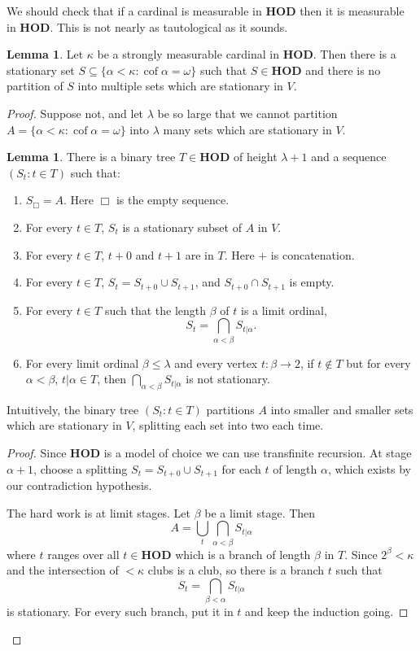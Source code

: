\documentclass[12pt]{report}
\newcommand{\HOD}{\mathbf{HOD}}
\DeclareMathOperator{\cof}{cof}
\theoremstyle{definition}
\newtheorem{lemma}[theorem]{Lemma}
\begin{document}
We should check that if a cardinal is measurable in $\HOD$ then it is measurable in $\HOD$. This is not nearly as tautological as it sounds.
\begin{lemma}
Let $\kappa$ be a strongly measurable cardinal in $\HOD$.
Then there is a stationary set $S \subseteq \{\alpha < \kappa: \cof \alpha = \omega\}$ such that $S \in \HOD$ and there is no partition of $S$ into multiple sets which are stationary in $V$.
\end{lemma}
\begin{proof}
Suppose not, and let $\lambda$ be so large that we cannot partition $A = \{\alpha < \kappa: \cof \alpha = \omega\}$ into $\lambda$ many sets which are stationary in $V$.
\begin{lemma}
There is a binary tree $T \in \HOD$ of height $\lambda + 1$ and a sequence $(S_t: t \in T)$ such that:
\begin{enumerate}
\item $S_\Box = A$. Here $\Box$ is the empty sequence.
\item For every $t \in T$, $S_t$ is a stationary subset of $A$ in $V$.
\item For every $t \in T$, $t+0$ and $t+1$ are in $T$. Here $+$ is concatenation.
\item For every $t \in T$, $S_t = S_{t+0}\cup S_{t+1}$, and $S_{t+0} \cap S_{t+1}$ is empty.
\item For every $t \in T$ such that the length $\beta$ of $t$ is a limit ordinal,
$$S_t = \bigcap_{\alpha < \beta} S_{t|\alpha}.$$
\item For every limit ordinal $\beta \leq \lambda$ and every vertex $t: \beta \to 2$, if $t \notin T$ but for every $\alpha < \beta$, $t|\alpha \in T$, then $\bigcap_{\alpha<\beta} S_{t|\alpha}$ is not stationary.
\end{enumerate}
\end{lemma}
Intuitively, the binary tree $(S_t: t \in T)$ partitions $A$ into smaller and smaller sets which are stationary in $V$, splitting each set into two each time.
\begin{proof}
Since $\HOD$ is a model of choice we can use transfinite recursion.
At stage $\alpha+1$, choose a splitting $S_t = S_{t+0} \cup S_{t+1}$ for each $t$ of length $\alpha$, which exists by our contradiction hypothesis.

The hard work is at limit stages. Let $\beta$ be a limit stage. Then
$$A = \bigcup_t \bigcap_{\alpha < \beta} S_{t|\alpha}$$
where $t$ ranges over all $t \in \HOD$ which is a branch of length $\beta$ in $T$.
Since $2^\beta < \kappa$ and the intersection of $<\kappa$ clubs is a club, so there is a branch $t$ such that
$$S_t = \bigcap_{\beta < \alpha} S_{t|\alpha}$$
is stationary. For every such branch, put it in $t$ and keep the induction going.
\end{proof}


\end{proof}
\end{document}
